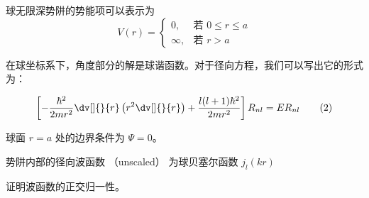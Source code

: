 
\begin{issues}
\issueDraft
\end{issues}


球无限深势阱的势能项可以表示为
$$
V(r)=
\begin{cases}
0,  & \text{若 $0\leq r\leq a$} \\
\infty, & \text{若 $r>a$}
\end{cases}\tag{1}
$$

在球坐标系下，角度部分的解是球谐函数。对于径向方程，我们可以写出它的形式为：

\begin{equation}
\left[-\frac{\hbar^2}{2mr^2} \dv[]{}{r}\left(r^2\dv[]{}{r}\right) + \frac{l(l + 1)\hbar^2}{2mr^2}\right]R_{nl} = ER_{nl}\tag{2}
\end{equation}

球面 $r = a$ 处的边界条件为 $\Psi = 0$。

势阱内部的径向波函数 （unscaled） 为球贝塞尔函数 $j_l(kr)$

证明波函数的正交归一性。
